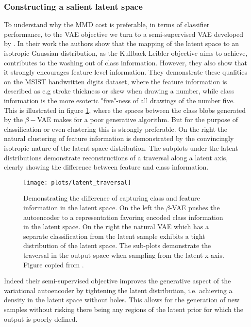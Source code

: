 \subsubsection{Constructing a salient latent space}

To understand why the MMD cost is preferable, in terms of classifier performance, to the VAE objective we turn to a semi-supervised VAE developed by \citet{Antoran2019}. In their work the authors show that the mapping of the latent space to an isotropic Gaussian distribution, as the Kullback-Leibler objective aims to achieve, contributes to the washing out of class information. However, they also show that it strongly encourages feature level information. They demonstrate these qualities on the MSIST handwritten digits dataset, where the feature information is described as e.g stroke thickness or skew when drawing a number, while class information is the more esoteric "five"-ness of all drawings of the number five. This is illustrated in figure \ref{fig:latent_traversal}, where the spaces between the class blobs generated by the $\beta-$VAE makes for a poor generative algorithm. But for the purpose of classification or even clustering this is strongly preferable. On the right the natural clustering of feature information is demonstrated by the convincingly isotropic nature of the latent space distribution. The subplots under the latent distributions demonstrate reconstructions of a traversal along a latent axis, clearly showing the difference between feature and class information. 

\begin{figure}
\centering
\texttt{[image: plots/latent\_traversal]}
\caption[Difference between generative and discriminative latent spaces]{Demonstrating the difference of capturing class and feature information in the latent space. On the left the $\beta$-VAE pushes the autoencoder to a representation favoring encoded class information in the latent space. On the right the natural VAE which has a separate classification from the latent sample exhibits a tight distribution of the latent space. The sub-plots demonstrate the traversal in the output space when sampling from the latent x-axis. Figure copied from \citet{Antoran2019}.}\label{fig:latent_traversal}
\end{figure}

Indeed their semi-supervised objective improves the generative aspect of the variational autoencoder by tightening the latent distribution, i.e. achieving a density in the latent space without holes. This allows for the generation of new samples without risking there being any regions of the latent prior for which the output is poorly defined.


